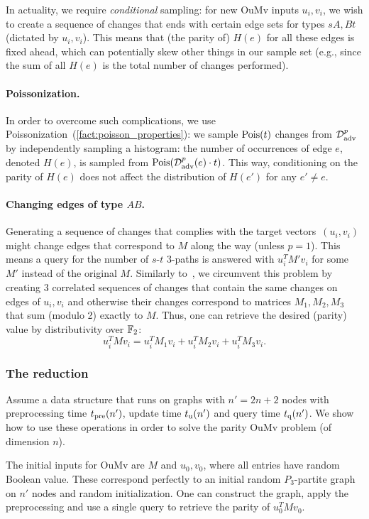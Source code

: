 \documentclass[letter,11pt]{article}
\newcommand{\oumv}{\textnormal{\textsf{OuMv}}\xspace}
\newcommand{\paths}[3]{${#1}$-${#2}$ ${#3}$-paths\xspace}
\newcommand{\tp}{t_{\textnormal{pre}}}
\newcommand{\tu}{t_{\textnormal{u}}}
\newcommand{\tq}{t_{\textnormal{q}}}
\newcommand{\advdist}{\mathcal{D}_\textnormal{adv}}
\begin{document}
In actuality, we require \emph{conditional} sampling: for new \oumv inputs $u_i, v_i$, we wish to create a sequence of changes that ends with certain edge sets for types $sA, Bt$ (dictated by $u_i, v_i$). This means that (the parity of) $H(e)$ for all these edges is fixed ahead, which can potentially skew other things in our sample set (e.g., since the sum of all $H(e)$ is the total number of changes performed).

\paragraph{Poissonization.}
In order to overcome such complications, we use Poissonization~(\cref{fact:poisson_properties}): we sample $\poisson{t}$ changes from $\advdist^p$ by independently sampling a histogram: the number of occurrences of edge $e$, denoted $H(e)$, is sampled from $\poisson{\advdist^p (e)\cdot t}$. 
This way, conditioning on the parity of $H(e)$ does not affect the distribution of $H(e')$ for any $e' \neq e$.


\paragraph{Changing edges of type $AB$.}
Generating a sequence of changes that complies with the target vectors~$(u_i, v_i)$ might change edges that correspond to $M$ along the way (unless $p=1$).
This means a query for the number of \paths{s}{t}{3} is answered with $u_i^T M' v_i$ for some $M'$ instead of the original $M$. 
Similarly to~\cite{HLS22}, we circumvent this problem by creating $3$ correlated sequences of changes that contain the same changes on edges of $u_i, v_i$ and otherwise their changes correspond to matrices $M_1, M_2, M_3$ that sum (modulo 2) exactly to $M$. 
Thus, one can retrieve the desired (parity) value by distributivity over $\mathbb{F}_2$:
\[
    u_i^T M v_i = u_i^T M_1 v_i + u_i^T M_2 v_i + u_i^T M_3 v_i .
\]


\subsubsection{The reduction}
Assume a data structure that runs on graphs with $n' = 2n+2$ nodes with preprocessing time $\tp(n')$, update time $\tu(n')$ and query time $\tq(n')$. We show how to use these operations in order to solve the parity \oumv problem (of dimension $n$).  

The initial inputs for \oumv are $M$ and $u_0, v_0$, where all entries have random Boolean value. These correspond perfectly to an initial random $P_3$-partite graph on $n'$ nodes and random initialization. 
One can construct the graph, apply the preprocessing and use a single query to retrieve the parity of $u_0 ^T M v_0$.
\end{document}
